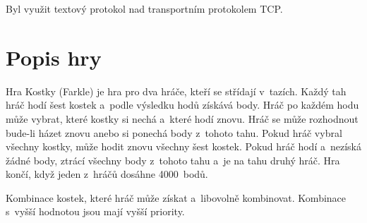 \documentclass[12pt, a4paper]{article}
\begin{document}
Byl využit textový protokol nad transportním protokolem TCP.

\newpage

\section{Popis hry}
Hra Kostky (Farkle) je hra pro dva hráče, kteří se střídají v~tazích.
Každý tah hráč hodí šest kostek a~podle výsledku hodů získává body.
Hráč po každém hodu může vybrat, které kostky si nechá a~které hodí znovu.
Hráč se může rozhodnout bude-li házet znovu anebo si ponechá body z~tohoto tahu.
Pokud hráč vybral všechny kostky, může hodit znovu všechny šest kostek.
Pokud hráč hodí a~nezíská žádné body, ztrácí všechny body z~tohoto tahu a~je na tahu druhý hráč.
Hra končí, když jeden z~hráčů dosáhne 4000~bodů.

Kombinace kostek, které hráč může získat a~libovolně kombinovat.
Kombinace s~vyšší hodnotou jsou mají vyšší priority.
\end{document}
